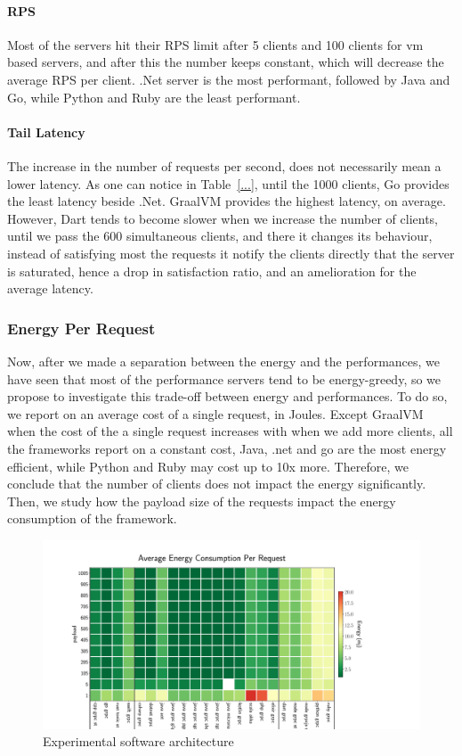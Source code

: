 \paragraph{RPS}
Most of the servers hit their RPS limit after 5 clients and 100 clients for vm based servers, and after this the number keeps constant, which will decrease the average RPS per client.
.Net server is the most performant, followed by Java and Go, while Python and Ruby are the least performant.

\paragraph{Tail Latency}
The increase in the number of requests per second, does not necessarily mean a lower latency.
As one can notice in Table~\ref{...}, until the 1000 clients, Go provides the least latency beside .Net.
GraalVM provides the highest latency, on average.
However, Dart tends to become slower when we increase the number of clients, until we pass the 600 simultaneous clients, and there it changes its behaviour, instead of satisfying most the requests it notify the clients directly that the server is saturated, hence a drop in satisfaction ratio, and an amelioration for the average latency.


\subsubsection{Energy Per Request}
Now, after we made a separation between the energy and the performances, we have seen that most of the performance servers tend to be energy-greedy, so we propose to investigate this trade-off between energy and performances.
To do so, we report on an average cost of a single request, in Joules.
Except GraalVM when the cost of the a single request increases with when we add more clients, all the frameworks report on a constant cost, Java, .net and go are the most energy efficient, while Python and Ruby may cost up to 10x more.
Therefore, we conclude that the number of clients does not impact the energy significantly.
Then, we study how the payload size of the requests impact the energy consumption of the framework.

\begin{figure}[!hbt]
    \begin{center}
        \includegraphics[width=1.2\linewidth]{imgs/energy_cost_clients}
    \end{center}
    \caption{Experimental software architecture}\label{fig:rpcprotocol}
\end{figure}

